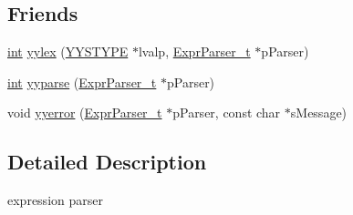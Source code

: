 \subsection*{Friends}
\begin{DoxyCompactItemize}
\item 
\hyperlink{sphinxexpr_8cpp_a4a26e8f9cb8b736e0c4cbf4d16de985e}{int} \hyperlink{classExprParser__t_a59e6ffcee4b94eb6ad0a62de3fd9e7ee}{yylex} (\hyperlink{unionYYSTYPE}{Y\-Y\-S\-T\-Y\-P\-E} $\ast$lvalp, \hyperlink{classExprParser__t}{Expr\-Parser\-\_\-t} $\ast$p\-Parser)
\item 
\hyperlink{sphinxexpr_8cpp_a4a26e8f9cb8b736e0c4cbf4d16de985e}{int} \hyperlink{classExprParser__t_ab2a3c65be4ab0f1397955f13bc449882}{yyparse} (\hyperlink{classExprParser__t}{Expr\-Parser\-\_\-t} $\ast$p\-Parser)
\item 
void \hyperlink{classExprParser__t_ae0ec2be8acad512f52708b3fcdc98066}{yyerror} (\hyperlink{classExprParser__t}{Expr\-Parser\-\_\-t} $\ast$p\-Parser, const char $\ast$s\-Message)
\end{DoxyCompactItemize}


\subsection{Detailed Description}
expression parser 

